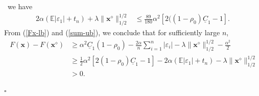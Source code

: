 \documentclass[10pt,a4paper]{amsart}
\newenvironment{proof}{{\noindent\bf Proof.}\,}{\hfill $\square$\par\mbox{}}
\begin{document}
\begin{proof}
	we have
	\begin{equation}\label{sum-ub}
		\begin{aligned}
			2\alpha(\mathbb{E}|\varepsilon_1|+t_n)+\lambda\|\mathbf{x}^\diamond\|_{1/2}^{1/2}
			&\leq\frac{89}{180}\alpha^2[2((1-\rho_0)\underline{C}_1-1].
		\end{aligned}
	\end{equation}
	From (\ref{Fx-lb}) and (\ref{sum-ub}), we conclude that for sufficiently large $n$,
	\begin{equation}
		\begin{aligned}
			~F(\mathbf{x})-F(\mathbf{x}^\diamond)
			&\geq\alpha^2 \underline{C}_1(1-\rho_0)-\frac{2\alpha}{n}\sum_{i=1}^n|\varepsilon_i|-\lambda\|\mathbf{x}^\diamond\|_{1/2}^{1/2}-\frac{\alpha^2}{2}\\
			&\geq\frac{1}{2}\alpha^2[2(1-\rho_0)\underline{C}_1-1]-2\alpha(\mathbb{E}|\varepsilon_1|+t_n)-\lambda\|\mathbf{x}^\diamond\|_{1/2}^{1/2}\\
			&>0.		
		\end{aligned}
	\end{equation}

	
	

\end{proof}
\end{document}
